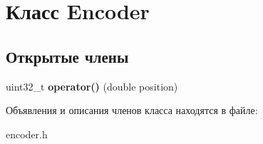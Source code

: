 \hypertarget{classEncoder}{}\section{Класс Encoder}
\label{classEncoder}
\subsection*{Открытые члены}
\begin{DoxyCompactItemize}
\item 
\mbox{\label{classEncoder_ad9aec8f333b7e280acb128f92da46659}} 
uint32\+\_\+t {\bfseries operator()} (double position)
\end{DoxyCompactItemize}


Объявления и описания членов класса находятся в файле\+:\begin{DoxyCompactItemize}
\item 
encoder.\+h\end{DoxyCompactItemize}
